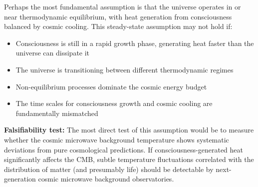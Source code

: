 \documentclass[12pt, aip, jcp]{revtex4-2} %
\begin{document}
Perhaps the most fundamental assumption is that the universe operates in or near thermodynamic equilibrium, with heat generation from consciousness balanced by cosmic cooling. This steady-state assumption may not hold if:

\begin{itemize}
    \item Consciousness is still in a rapid growth phase, generating heat faster than the universe can dissipate it
    \item The universe is transitioning between different thermodynamic regimes
    \item Non-equilibrium processes dominate the cosmic energy budget
    \item The time scales for consciousness growth and cosmic cooling are fundamentally mismatched
\end{itemize}

\textbf{Falsifiability test:} The most direct test of this assumption would be to measure whether the cosmic microwave background temperature shows systematic deviations from pure cosmological predictions. If consciousness-generated heat significantly affects the CMB, subtle temperature fluctuations correlated with the distribution of matter (and presumably life) should be detectable by next-generation cosmic microwave background observatories.
\end{document}
